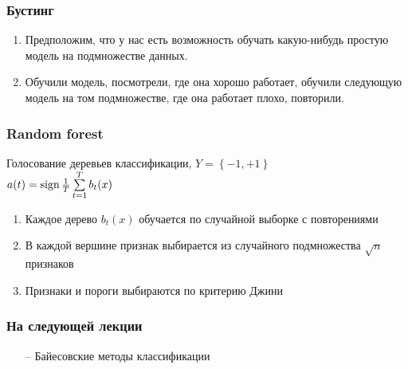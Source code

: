 \documentclass[12pt]{beamer}
\begin{document}
\begin{frame}\frametitle{Бустинг}
\begin{enumerate} [--]
\item Предположим, что у нас есть возможность обучать какую-нибудь простую модель на подмножестве данных.
\item Обучили модель, посмотрели, где она хорошо работает, обучили следующую модель на том подмножестве, где она работает плохо, повторили.
\end{enumerate}
\end{frame}

\begin{frame}\frametitle{Random forest}
Голосование деревьев классификации, $Y = \left\{ -1, +1 \right\}$\\
$a(t) = \operatorname{sign} \frac{1}{T} \sum\limits_{t=1}^T b_t(x)$\\
\begin{enumerate}[--]
\item Каждое дерево $b_t(x)$ обучается по случайной выборке с повторениями
\item В каждой вершине признак выбирается из случайного подмножества $\sqrt{n}$ признаков
\item Признаки и пороги выбираются по критерию Джини
\end{enumerate}
\end{frame}

\begin{frame}\frametitle{На следующей лекции}
\begin{itemize}
\item[--] Байесовские методы классификации
\end{itemize}
\end{frame}
\end{document}
